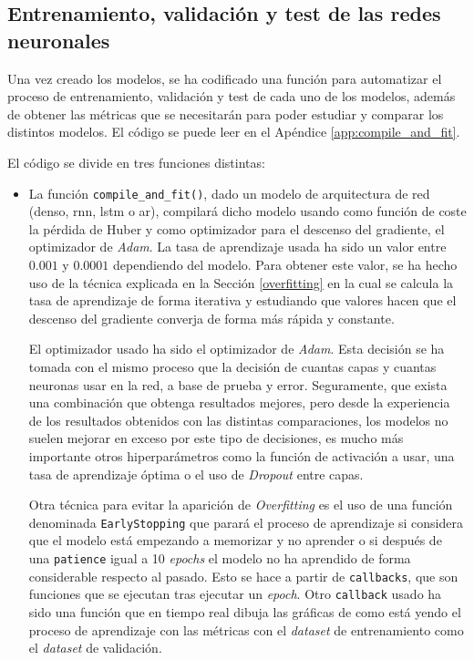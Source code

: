 \subsection{Entrenamiento, validación y test de las redes neuronales}


Una vez creado los modelos, se ha codificado una función para automatizar el proceso de entrenamiento, validación y test de cada uno de los modelos, además de obtener las métricas que se necesitarán para poder estudiar y comparar los distintos modelos. El código se puede leer en el Apéndice \ref{app:compile_and_fit}.
\newline

El código se divide en tres funciones distintas:
\begin{itemize}
    \item La función \small{\verb|compile_and_fit()|}, dado un modelo de arquitectura de red (denso, \acrshort{rnn}, \acrshort{lstm} o \acrshort{ar}), compilará dicho modelo usando como función de coste la pérdida de Huber y como optimizador para el descenso del gradiente, el optimizador de \textit{Adam}. La tasa de aprendizaje usada ha sido un valor entre $0.001$ y $0.0001$ dependiendo del modelo. Para obtener este valor, se ha hecho uso de la técnica explicada en la Sección \ref{overfitting} en la cual se calcula la tasa de aprendizaje de forma iterativa y estudiando que valores hacen que el descenso del gradiente converja de forma más rápida y constante.
    \newline
    
    El optimizador usado ha sido el optimizador de \textit{Adam}. Esta decisión se ha tomada con el mismo proceso que la decisión de cuantas capas y cuantas neuronas usar en la red, a base de prueba y error. Seguramente, que exista una combinación que obtenga resultados mejores, pero desde la experiencia de los resultados obtenidos con las distintas comparaciones, los modelos no suelen mejorar en exceso por este tipo de decisiones, es mucho más importante otros hiperparámetros como la función de activación a usar, una tasa de aprendizaje óptima o el uso de \textit{Dropout} entre capas.
    \newline
    
    Otra técnica para evitar la aparición de \textit{Overfitting} es el uso de una función denominada \small{\verb|EarlyStopping|} que parará el proceso de aprendizaje si considera que el modelo está empezando a memorizar y no aprender o si después de una \small{\verb|patience|} igual a 10 \textit{epochs} el modelo no ha aprendido de forma considerable respecto al pasado. Esto se hace a partir de \small\verb|callbacks|, que son funciones que se ejecutan tras ejecutar un \textit{epoch}. Otro \small\verb|callback| usado ha sido una función que en tiempo real dibuja las gráficas de como está yendo el proceso de aprendizaje con las métricas con el \textit{dataset} de entrenamiento como el \textit{dataset} de validación.
    \newline
    

\end{itemize}
